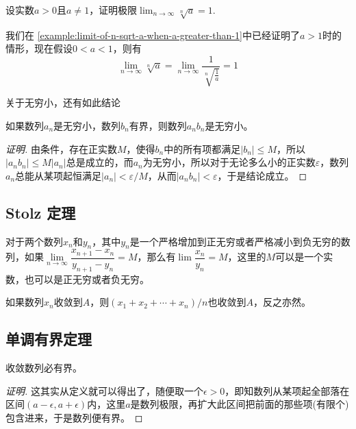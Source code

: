 \begin{example}
  \label{example:limit-of-n-sqrt-a}
  设实数$a>0$且$a \neq 1$，证明极限$\lim_{n \to \infty} \sqrt[n]{a} = 1$.

  我们在 \autoref{example:limit-of-n-sqrt-a-when-a-greater-than-1}中已经证明了$a>1$时的情形，现在假设$0<a<1$，则有
  \[ \lim_{n \to \infty} \sqrt[n]{a} = \lim_{n \to \infty} \frac{1}{\sqrt[n]{\frac{1}{a}}} = 1 \]
\end{example}

关于无穷小，还有如此结论
\begin{theorem}
  如果数列$a_n$是无穷小，数列$b_n$有界，则数列$a_nb_n$是无穷小。
\end{theorem}

\begin{proof}[证明]
  由条件，存在正实数$M$，使得$b_n$中的所有项都满足$|b_n|\leqslant M$，所以$|a_nb_n| \leqslant M |a_n|$总是成立的，而$a_n$为无穷小，所以对于无论多么小的正实数$\varepsilon$，数列$a_n$总能从某项起恒满足$|a_n|<\varepsilon/M$，从而$|a_nb_n|<\varepsilon$，于是结论成立。
\end{proof}

\subsection{Stolz 定理}
\label{sec:stolz-theorem}



\begin{theorem}[Stolz 定理]
  对于两个数列$x_n$和$y_n$，其中$y_n$是一个严格增加到正无穷或者严格减小到负无穷的数列，如果$\lim\limits_{n\to\infty}\dfrac{x_{n+1}-x_n}{y_{n+1}-y_n} = M$，那么有$\lim\limits \dfrac{x_n}{y_n} = M$，这里的$M$可以是一个实数，也可以是正无穷或者负无穷。
\end{theorem}

\begin{inference}
  如果数列$x_n$收敛到$A$，则$(x_1+x_2+\cdots+x_n)/n$也收敛到$A$，反之亦然。
\end{inference}


\subsection{单调有界定理}
\label{sec:theorem-of-monotone-bounded}

\begin{theorem}[收敛数列的有界性]
  收敛数列必有界。
\end{theorem}

\begin{proof}[证明]
  这其实从定义就可以得出了，随便取一个$\epsilon>0$，即知数列从某项起全部落在区间$(a-\epsilon, a+\epsilon)$内，这里$a$是数列极限，再扩大此区间把前面的那些项(有限个)包含进来，于是数列便有界。
\end{proof}

